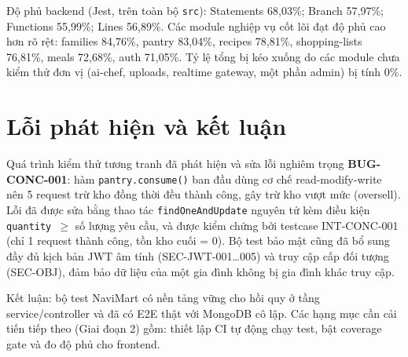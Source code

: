 Độ phủ backend (Jest, trên toàn bộ \texttt{src}): Statements 68,03\%; Branch 57,97\%; Functions 55,99\%; Lines 56,89\%. Các module nghiệp vụ cốt lõi đạt độ phủ cao hơn rõ rệt: families 84,76\%, pantry 83,04\%, recipes 78,81\%, shopping-lists 76,81\%, meals 72,68\%, auth 71,05\%. Tỷ lệ tổng bị kéo xuống do các module chưa kiểm thử đơn vị (ai-chef, uploads, realtime gateway, một phần admin) bị tính 0\%.

\section{Lỗi phát hiện và kết luận}
Quá trình kiểm thử tương tranh đã phát hiện và sửa lỗi nghiêm trọng \textbf{BUG-CONC-001}: hàm \texttt{pantry.consume()} ban đầu dùng cơ chế read-modify-write nên 5 request trừ kho đồng thời đều thành công, gây trừ kho vượt mức (oversell). Lỗi đã được sửa bằng thao tác \texttt{findOneAndUpdate} nguyên tử kèm điều kiện \texttt{quantity \(\geq\)} số lượng yêu cầu, và được kiểm chứng bởi testcase INT-CONC-001 (chỉ 1 request thành công, tồn kho cuối = 0). Bộ test bảo mật cũng đã bổ sung đầy đủ kịch bản JWT âm tính (SEC-JWT-001…005) và truy cập cấp đối tượng (SEC-OBJ), đảm bảo dữ liệu của một gia đình không bị gia đình khác truy cập.

Kết luận: bộ test NaviMart có nền tảng vững cho hồi quy ở tầng service/controller và đã có E2E thật với MongoDB cô lập. Các hạng mục cần cải tiến tiếp theo (Giai đoạn 2) gồm: thiết lập CI tự động chạy test, bật coverage gate và đo độ phủ cho frontend.
